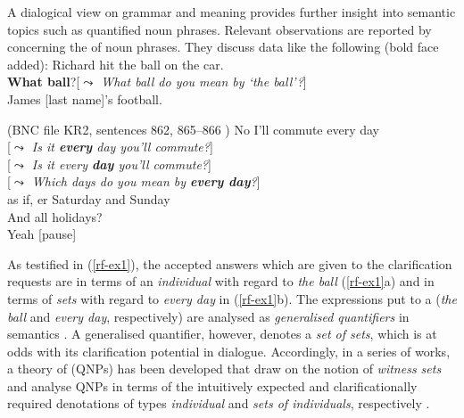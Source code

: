 \documentclass[output=paper
 	        ,biblatex
                ,babelshorthands
                ,newtxmath
                ,draftmode
                ,colorlinks, citecolor=brown
]{langscibook}
\begin{document}
A dialogical view on grammar and meaning provides further insight into semantic topics such as quantified noun phrases.
%
Relevant observations are reported by \citet{Purver:Ginzburg:2004} concerning the  of noun phrases.
%
They discuss data like the following (bold face added):
%
\ea \label{rf-ex1}
  \ea  {} Richard hit the ball on the car. \\
 \textbf{What ball}?\hspace*{0.25cm}[\emph{$\leadsto$ What ball do you mean by  `the ball'?}] \\
 James [last name]'s football. \par\smallskip
\hfill (BNC file KR2, sentences 862, 865--866 )
  \ex {} No I'll commute every day \\
 [\emph{$\leadsto$ Is it \textbf{every} day you'll commute?}]\\
 [\emph{$\leadsto$ Is it every \textbf{day} you'll commute?}]\\
 [\emph{$\leadsto$ Which days do you mean by \textbf{every day}?}]\\
 as if, er Saturday and Sunday \\
 And all holidays? \\
 Yeah [pause]
  \z
\z

As testified in (\ref{rf-ex1}), the accepted answers which are given to the clarification requests are in terms of an \emph{individual} with regard to \textit{the ball} (\ref{rf-ex1}a) and in terms of \emph{sets} with regard to \textit{every day} in (\ref{rf-ex1}b).
%
The expressions put to a  (\textit{the ball} and \textit{every day}, respectively) are analysed as \emph{generalised quantifiers} in semantics \citep{montague73}.
%
A generalised quantifier, however, denotes a \emph{set of sets}, which is at odds with its clarification potential in dialogue. 
%
Accordingly, in a series of works, a theory of  (QNPs) has been developed that draw on the notion of \emph{witness sets}  \citep[]{Barwise:Cooper:1981} and analyse QNPs in terms of the intuitively expected and clarificationally required denotations of types \emph{individual} and \emph{sets of individuals}, respectively  \citep{Purver:Ginzburg:2004,Ginzburg:Purver:2012,Ginzburg:2012,Cooper:2013,Luecking:Ginzburg:2018,Cooper:ms}. 
%
\end{document}
